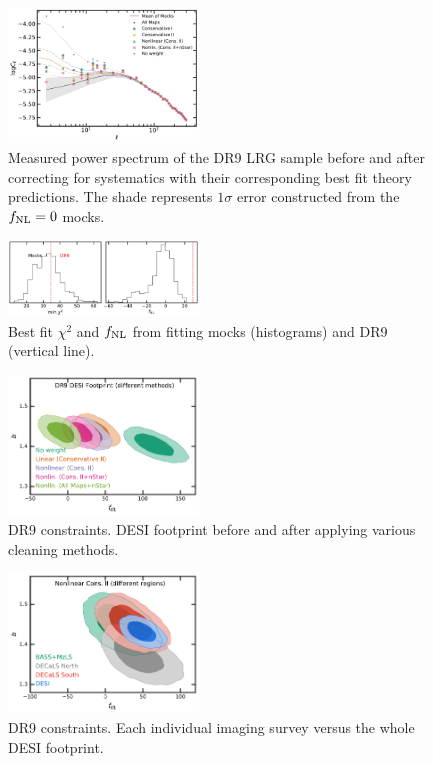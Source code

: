 \begin{figure}
    \centering
    \includegraphics[width=0.45\textwidth]{figures/model_dr9.pdf} 
    \caption{Measured power spectrum of the DR9 LRG sample before and after correcting for systematics with their corresponding best fit theory predictions. The shade represents $1\sigma$ error constructed from the $f_{\rm NL}=0$ mocks.}
    \label{fig:cl_dr9}
\end{figure}

\begin{figure}
\centering
    \includegraphics[width=0.45\textwidth]{figures/pdf_dr9vsmocks.pdf} 
    \caption{Best fit $\chi^{2}$ and $f_{\rm NL}$ from fitting mocks (histograms) and DR9 (vertical line).}\label{fig:dr9vsmocks}
\end{figure}

\begin{figure}
    \centering
    \includegraphics[width=0.45\textwidth]{figures/mcmc_dr9methods.pdf} 
    \caption{DR9 constraints. DESI footprint before and after applying various cleaning methods.}\label{fig:mcmc_dr9}
\end{figure}

\begin{figure}
    \centering
    \includegraphics[width=0.45\textwidth]{figures/mcmc_dr9regions.pdf} 
    \caption{DR9 constraints. Each individual imaging survey versus the whole DESI footprint.}\label{fig:mcmc_dr9reg}
\end{figure}

